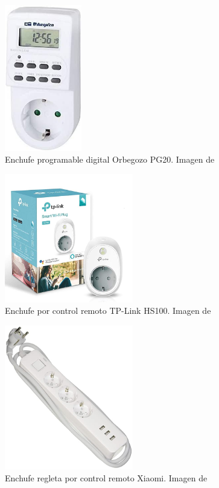 \documentclass[a4paper,10pt]{article}
\begin{document}
\begin{figure}
  \centering
  \includegraphics[width=0.3\textwidth]{img/enchufe_programable_digital.jpg}
  \caption{Enchufe programable digital Orbegozo PG20. Imagen de~\cite{amazonwebsiteOrbegozoPG202019}}\label{fig:enchufe-programable-digital}
\end{figure}

\begin{figure}
  \centering
  \includegraphics[width=0.5\textwidth]{img/enchufe_remoto.jpg}
  \caption{Enchufe por control remoto TP-Link HS100. Imagen de~\cite{amazonwebsiteTPLinkHS100Enchufe}}\label{fig:enchufe-remoto}
\end{figure}

\begin{figure}[H]
  \centering
  \includegraphics[width=0.5\textwidth]{img/enchufe_regleta.jpg}
  \caption{Enchufe regleta por control remoto Xiaomi. Imagen
    de~\cite{amazonwebsiteXiaomi18082Regleta2019}}\label{fig:enchufe-regleta}
\end{figure}
\end{document}
